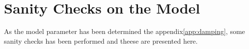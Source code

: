 \section{Sanity Checks on the Model}
As the model parameter has been determined the appendix\vref{app:damping}, some sanity checks has been performed and theese are presented here.



